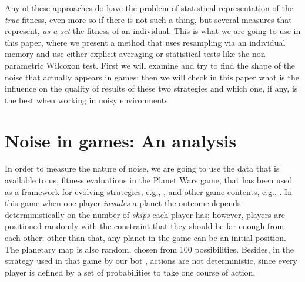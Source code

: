 \documentclass{llncs}
\begin{document}
Any of these approaches do have the problem of statistical
representation of the {\em true} fitness, even more so if there is not
such a thing, but several measures that represent, {\em as a set}
the fitness of an individual. This is what we are going to use in this
paper, where we present a method that uses resampling via an
individual memory and use either explicit averaging or statistical
tests like the non-parametric Wilcoxon test. 
First we will examine and try to find the shape of the noise that
actually appears in games; then we will check in this paper what is the influence on the quality of
results of these two strategies and which one, if any, is the best
when working in noisy environments.  


\section{Noise in games: An analysis}
\label{sec:noise}

In order to measure the nature of noise, we are going to use the data
that is available to us, fitness evaluations in the
Planet Wars game, that has been used as a framework for evolving strategies, e.g., \cite{DBLP:journals/jcst/MoraFGGF12}, and other game contents, e.g., \cite{lara2014balance}. %
In this game when one player {\em invades} a planet the outcome depends
deterministically on the number of {\em ships} each player has; however, players are positioned randomly with the
constraint that they should be far enough from each other; other than
that, any planet in the game can be an initial position. The planetary
map is also random, chosen from 100 possibilities. Besides, in
the strategy used in that game by our bot \cite{DBLP:conf/iwann/Fernandez-AresMMGF11}, actions are not deterministic, since
every player is defined by a set of probabilities to take one course
of action. 
\end{document}
